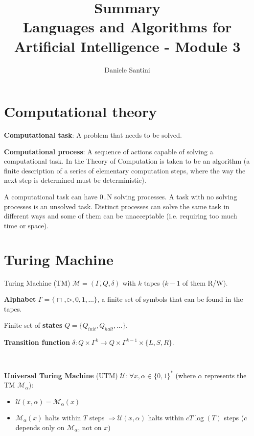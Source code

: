 \documentclass[]{article}
\title{Summary \\ \large Languages and Algorithms for Artificial Intelligence - Module 3}
\author{Daniele Santini}
\begin{document}

\section{Computational theory}

\textbf{Computational task}: A problem that needs to be solved.

\textbf{Computational process}: A sequence of actions capable of solving a computational task. In the Theory of Computation is taken to be an algorithm (a finite description of a series of elementary computation steps, where the way the next step is determined must be deterministic).

A computational task can have 0..N solving processes. A task with no solving processes is an unsolved task. Distinct processes can solve the same task in different ways and some of them can be unacceptable (i.e. requiring too much time or space).

\section{Turing Machine}

Turing Machine (TM) $\mathcal{M} = (\Gamma,Q,\delta)$ with $k$ tapes ($k-1$ of them R/W).

\textbf{Alphabet} $\Gamma = \{\Box, \rhd, 0, 1, \dots\}$, a finite set of symbols that can be found in the tapes.

Finite set of \textbf{states} $Q = \{Q_{init},Q_{halt},\dots\}$.

\textbf{Transition function} $\delta: Q \times \Gamma^k \to Q \times \Gamma^{k-1} \times \{L,S,R\}$.

\

\textbf{Universal Turing Machine} (UTM) $\mathcal{U}$: $\forall x, \alpha \in \{0,1\}^*$ (where $\alpha$ represents the TM $\mathcal{M}_{\alpha}$):
\begin{itemize}
	\item $\mathcal{U}(x,\alpha) = \mathcal{M}_{\alpha}(x)$
	\item $\mathcal{M}_{\alpha}(x)$ halts within $T$ steps $\Rightarrow \mathcal{U}(x,\alpha)$ halts within $cT\log(T)$ steps ($c$ depends only on $\mathcal{M}_{\alpha}$, not on $x$)
\end{itemize}

\
\end{document}
